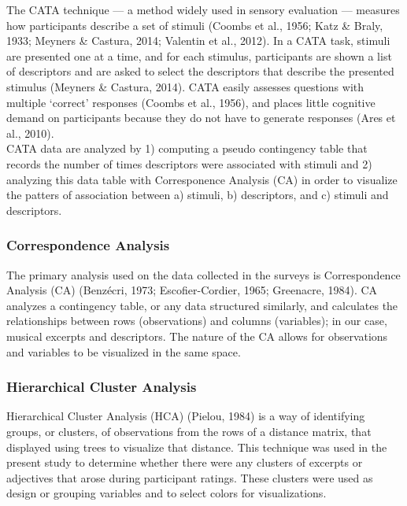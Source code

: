 \documentclass[
  english,
  man,floatsintext]{apa6}
\begin{document}
The CATA technique --- a method widely used in sensory evaluation --- measures how participants describe a set of stimuli (Coombs et al., 1956; Katz \& Braly, 1933; Meyners \& Castura, 2014; Valentin et al., 2012). In a CATA task, stimuli are presented one at a time, and for each stimulus, participants are shown a list of descriptors and are asked to select the descriptors that describe the presented stimulus (Meyners \& Castura, 2014). CATA easily assesses questions with multiple `correct' responses (Coombs et al., 1956), and places little cognitive demand on participants because they do not have to generate responses (Ares et al., 2010).\\
CATA data are analyzed by 1) computing a pseudo contingency table that records the number of times descriptors were associated with stimuli and 2) analyzing this data table with Corresponence Analysis (CA) in order to visualize the patters of association between a) stimuli, b) descriptors, and c) stimuli and descriptors.

\hypertarget{correspondence-analysis}{%
\subsubsection{Correspondence Analysis}\label{correspondence-analysis}}

The primary analysis used on the data collected in the surveys is Correspondence Analysis (CA) (Benzécri, 1973; Escofier-Cordier, 1965; Greenacre, 1984). CA analyzes a contingency table, or any data structured similarly, and calculates the relationships between rows (observations) and columns (variables); in our case, musical excerpts and descriptors. The nature of the CA allows for observations and variables to be visualized in the same space.

\hypertarget{hierarchical-cluster-analysis}{%
\subsubsection{Hierarchical Cluster Analysis}\label{hierarchical-cluster-analysis}}

Hierarchical Cluster Analysis (HCA) (Pielou, 1984) is a way of identifying groups, or clusters, of observations from the rows of a distance matrix, that displayed using trees to visualize that distance. This technique was used in the present study to determine whether there were any clusters of excerpts or adjectives that arose during participant ratings. These clusters were used as design or grouping variables and to select colors for visualizations.
\end{document}
